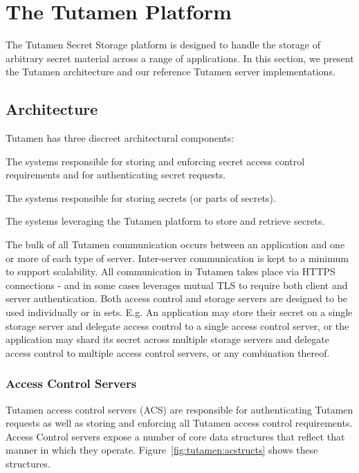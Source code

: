 \section{The Tutamen Platform}
\label{sec:tutamen}

The Tutamen Secret Storage platform is designed to handle the storage
of arbitrary secret material across a range of applications. In this
section, we present the Tutamen architecture and our reference Tutamen
server implementations.

\subsection{Architecture}
\label{sec:tutamen:arch}

Tutamen has three discreet architectural components:

\begin{packed_desc}
\item[Access Control Servers (ACS):] The systems responsible for
  storing and enforcing secret access control requirements and for
  authenticating secret requests.
\item[Storage Servers (SS):] The systems responsible for storing
  secrets (or parts of secrets).
\item[Applications:] The systems leveraging the Tutamen platform to
  store and retrieve secrets.
\end{packed_desc}

The bulk of all Tutamen communication occurs between an application
and one or more of each type of server. Inter-server communication is
kept to a minimum to support scalability. All communication in Tutamen
takes place via HTTPS connections - and in some cases leverages mutual
TLS to require both client and server authentication. Both access
control and storage servers are designed to be used individually or in
sets. E.g. An application may store their secret on a single storage
server and delegate access control to a single access control server,
or the application may shard its secret across multiple storage
servers and delegate access control to multiple access control
servers, or any combination thereof.

\subsubsection{Access Control Servers}
\label{sec:tutamen:arch:acs}

Tutamen access control servers (ACS) are responsible for
authenticating Tutamen requests as well as storing and enforcing all
Tutamen access control requirements. Access Control servers expose a
number of core data structures that reflect that manner in which they
operate. Figure~\ref{fig:tutamen:acstructs} shows these structures.

